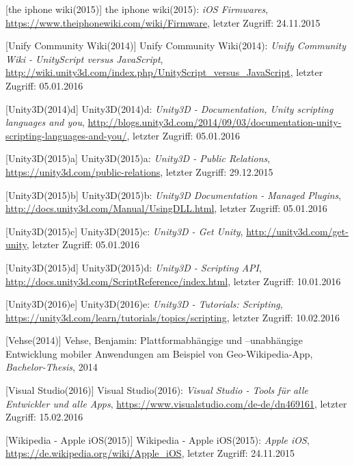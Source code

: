 \begin{thebibliography}{}
[the iphone wiki(2015)] the iphone wiki(2015): \emph{iOS Firmwares},
\url{https://www.theiphonewiki.com/wiki/Firmware}, letzter Zugriff: 24.11.2015

[Unify Community Wiki(2014)] Unify Community Wiki(2014): \emph{Unify Community Wiki - UnityScript versus JavaScript},
\url{http://wiki.unity3d.com/index.php/UnityScript_versus_JavaScript}, letzter Zugriff: 05.01.2016

[Unity3D(2014)d] Unity3D(2014)d: \emph{Unity3D - Documentation, Unity scripting languages and you},
\url{http://blogs.unity3d.com/2014/09/03/documentation-unity-scripting-languages-and-you/}, letzter Zugriff: 05.01.2016

[Unity3D(2015)a] Unity3D(2015)a: \emph{Unity3D - Public Relations},
\url{https://unity3d.com/public-relations}, letzter Zugriff: 29.12.2015

[Unity3D(2015)b] Unity3D(2015)b: \emph{Unity3D Documentation - Managed Plugins},
\url{http://docs.unity3d.com/Manual/UsingDLL.html}, letzter Zugriff: 05.01.2016

[Unity3D(2015)c] Unity3D(2015)c: \emph{Unity3D - Get Unity},
\url{http://unity3d.com/get-unity}, letzter Zugriff: 05.01.2016

[Unity3D(2015)d] Unity3D(2015)d: \emph{Unity3D - Scripting API},
\url{http://docs.unity3d.com/ScriptReference/index.html}, letzter Zugriff: 10.01.2016

[Unity3D(2016)e] Unity3D(2016)e: \emph{Unity3D - Tutorials: Scripting},
\url{https://unity3d.com/learn/tutorials/topics/scripting}, letzter Zugriff: 10.02.2016

[Vehse(2014)] Vehse, Benjamin:
\glqq Plattformabhängige und –unabhängige
Entwicklung mobiler Anwendungen am
Beispiel von Geo-Wikipedia-App\grqq, 
\emph{Bachelor-Thesis}, 2014

[Visual Studio(2016)] Visual Studio(2016): \emph{Visual Studio - Tools für alle Entwickler und alle Apps},
\url{https://www.visualstudio.com/de-de/dn469161}, letzter Zugriff: 15.02.2016

[Wikipedia - Apple iOS(2015)] Wikipedia - Apple iOS(2015): \emph{Apple iOS},
\url{https://de.wikipedia.org/wiki/Apple_iOS}, letzter Zugriff: 24.11.2015


\end{thebibliography}
